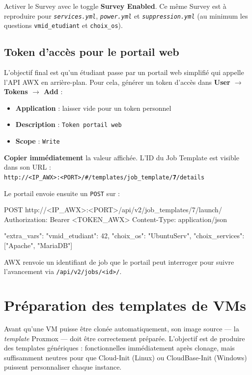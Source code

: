 \documentclass[a4paper]{article}
\newcommand{\cmd}[1]{\texttt{#1}}
\newcommand{\file}[1]{\texttt{\textit{#1}}}
\begin{document}
Activer le Survey avec le toggle \textbf{Survey Enabled}. Ce même Survey est à reproduire pour \file{services.yml}, \file{power.yml} et \file{suppression.yml} (au minimum les questions \cmd{vmid\_etudiant} et \cmd{choix\_os}).

\subsection{Token d'accès pour le portail web}

L'objectif final est qu'un étudiant passe par un portail web simplifié qui appelle l'API AWX en arrière-plan. Pour cela, générer un token d'accès dans \textbf{User \(\to\) Tokens \(\to\) Add} :

\begin{itemize}
  \item \textbf{Application} : laisser vide pour un token personnel
  \item \textbf{Description} : \cmd{Token portail web}
  \item \textbf{Scope} : \cmd{Write}
\end{itemize}

\textbf{Copier immédiatement} la valeur affichée. L'ID du Job Template est visible dans son URL :\\
\cmd{http://<IP\_AWX>:<PORT>/\#/templates/job\_template/\textbf{7}/details}

Le portail envoie ensuite un \cmd{POST} sur :

\begin{bashcode}
POST http://<IP_AWX>:<PORT>/api/v2/job_templates/7/launch/
Authorization: Bearer <TOKEN_AWX>
Content-Type: application/json

{
  "extra_vars": {
    "vmid_etudiant": 42,
    "choix_os": "UbuntuServ",
    "choix_services": ["Apache", "MariaDB"]
  }
}
\end{bashcode}

AWX renvoie un identifiant de job que le portail peut interroger pour suivre l'avancement via \cmd{/api/v2/jobs/<id>/}.


\section{Préparation des templates de VMs}

Avant qu'une VM puisse être clonée automatiquement, son image source --- la \textit{template} Proxmox --- doit être correctement préparée. L'objectif est de produire des templates génériques : fonctionnelles immédiatement après clonage, mais suffisamment neutres pour que Cloud-Init (Linux) ou CloudBase-Init (Windows) puissent personnaliser chaque instance.
\end{document}
